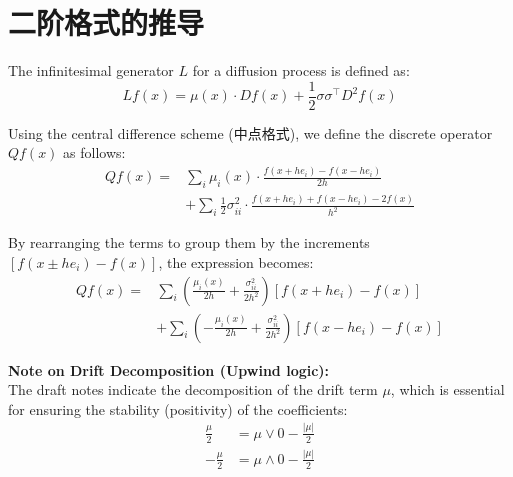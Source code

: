 	\SetNlSkip{0.2em}          %
	
	\usepackage{hyperref}
	
	
	
		

	\section{二阶格式的推导}
	
	The infinitesimal generator $L$ for a diffusion process is defined as:
	\begin{equation}
		Lf(x) = \mu(x) \cdot Df(x) + \frac{1}{2} \sigma \sigma^\top D^2 f(x)
	\end{equation}
	
	Using the central difference scheme (中点格式), we define the discrete operator $Qf(x)$ as follows:
	\begin{equation}
		\begin{aligned}
			Qf(x) = & \sum_{i} \mu_i(x) \cdot \frac{f(x+he_i) - f(x-he_i)}{2h} \\
			& + \sum_{i} \frac{1}{2} \sigma_{ii}^2 \cdot \frac{f(x+he_i) + f(x-he_i) - 2f(x)}{h^2}
		\end{aligned}
	\end{equation}
	
	By rearranging the terms to group them by the increments $[f(x \pm he_i) - f(x)]$, the expression becomes:
	\begin{equation}
		\begin{aligned}
			Qf(x) = & \sum_{i} \left( \frac{\mu_i(x)}{2h} + \frac{\sigma_{ii}^2}{2h^2} \right) \left[ f(x+he_i) - f(x) \right] \\
			& + \sum_{i} \left( -\frac{\mu_i(x)}{2h} + \frac{\sigma_{ii}^2}{2h^2} \right) \left[ f(x-he_i) - f(x) \right]
		\end{aligned}
	\end{equation}
	
	\vspace{1em}
	\noindent \textbf{Note on Drift Decomposition (Upwind logic):} \\
	The draft notes indicate the decomposition of the drift term $\mu$, which is essential for ensuring the stability (positivity) of the coefficients:
	\begin{align}
		\frac{\mu}{2} &= \mu \vee 0 - \frac{|\mu|}{2} \\
		-\frac{\mu}{2} &= \mu \wedge 0 - \frac{|\mu|}{2}
	\end{align}
	
